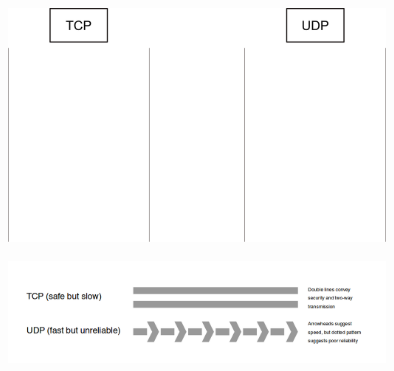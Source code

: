 \begin{slide}


    \includegraphics[width=100mm]{tcp-udp.png}

\end{slide}

\begin{slide}


    \includegraphics[width=100mm]{tcp-udp-2.png}

\end{slide}
    
